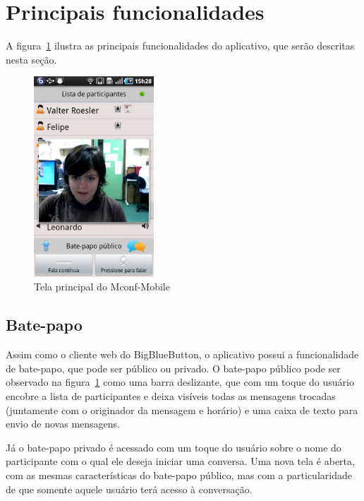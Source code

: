 \documentclass{acm_proc_article-sp}
\begin{document}
\section{Principais funcionalidades}

A figura~\ref{fig:mconf-mobile} ilustra as principais funcionalidades do aplicativo, que serão descritas nesta seção.

\begin{figure}[htp]
\centering
\includegraphics[width=45mm]{app1.png}
\caption{Tela principal do Mconf-Mobile}\label{fig:mconf-mobile}
\end{figure}

\subsection{Bate-papo}

Assim como o cliente web do BigBlueButton, o aplicativo possui a funcionalidade de bate-papo, que pode ser público ou privado. O bate-papo público pode ser observado na figura~\ref{fig:mconf-mobile} como uma barra deslizante, que com um toque do usuário encobre a lista de participantes e deixa visíveis todas as mensagens trocadas (juntamente com o originador da mensagem e horário) e uma caixa de texto para envio de novas mensagens.

Já o bate-papo privado é acessado com um toque do usuário sobre o nome do participante com o qual ele deseja iniciar uma conversa. Uma nova tela é aberta, com as mesmas características do bate-papo público, mas com a particularidade de que somente aquele usuário terá acesso à conversação.
\end{document}

